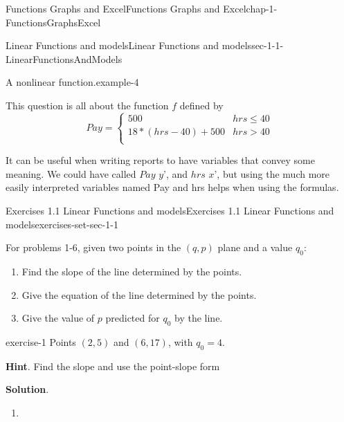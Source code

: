 \documentclass[oneside,10pt,]{book}
\numberwithin{equation}{section}
\begin{document}
\begin{chapterptx}{Functions Graphs and Excel}{}{Functions Graphs and Excel}{}{}{chap-1-FunctionsGraphsExcel}
\begin{sectionptx}{Linear Functions and models}{}{Linear Functions and models}{}{}{sec-1-1-LinearFunctionsAndModels}
\begin{example}{A nonlinear function.}{example-4}
\par
\hypertarget{p-64}{}%
This question is all about the function \(f\) defined by%
\begin{equation*}
Pay=\begin{cases}
500&hrs\le 40\\
18*(hrs-40)+500&hrs>40\\
\end{cases}
\end{equation*}
%
\end{example}
\hypertarget{p-65}{}%
It can be useful when writing reports to have variables that convey some meaning. We could have called \(Pay\) \textasciigrave{}\(y\)', and \(hrs\) \textasciigrave{}\(x\)', but using the much more easily interpreted variables named Pay and hrs helps when using the formulas.%
%
%
\typeout{************************************************}
\typeout{************************************************}
%
\begin{exercises-subsection-numberless}{Exercises 1.1 Linear Functions and models}{}{Exercises 1.1 Linear Functions and models}{}{}{exercises-set-sec-1-1}
\par\medskip\noindent%
\hypertarget{exercisegroup-1}{}%
\hypertarget{p-66}{}%
For problems 1-6, given two points in the \((q,p)\) plane and a value \(q_0\):%
\leavevmode%
\begin{enumerate}[label=(\alph*)]
\item\hypertarget{li-22}{}\hypertarget{p-67}{}%
Find the slope of the line determined by the points.%
\item\hypertarget{li-23}{}\hypertarget{p-68}{}%
Give the equation of the line determined by the points.%
\item\hypertarget{li-24}{}\hypertarget{p-69}{}%
Give the value of \(p\) predicted for \(q_0\) by the line.%
\end{enumerate}
\begin{exercisegroup}
\begin{divisionexerciseeg}{1}{}{}{exercise-1}%
\hypertarget{p-70}{}%
Points \((2,5)\) and \((6,17)\), with \(q_0=4\).%
\par\smallskip%
\noindent\textbf{Hint}.\hypertarget{hint-1}{}\quad%
\hypertarget{p-71}{}%
Find the slope and use the point-slope form%
\par\smallskip%
\noindent\textbf{Solution}.\hypertarget{solution-1}{}\quad%
\leavevmode%
\begin{enumerate}[label=(\alph*)]
\item\hypertarget{li-25}{}\hypertarget{p-72}{}%

\end{enumerate}
\end{divisionexerciseeg}
\end{exercisegroup}
\end{exercises-subsection-numberless}
\end{sectionptx}
\end{chapterptx}
\end{document}
